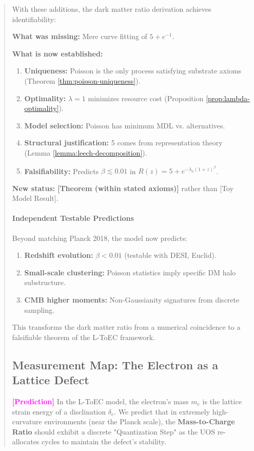 \documentclass[11pt,titlepage]{article}
\newcommand{\tagpred}{\textcolor{magenta}{\textbf{[Prediction]}} }
\begin{document}
\begin{abstract}
With these additions, the dark matter ratio derivation achieves identifiability:

\begin{tcolorbox}[colback=green!5!white,colframe=green!75!black,title=Identifiability Achieved]
\textbf{What was missing:} Mere curve fitting of $5 + e^{-1}$.

\textbf{What is now established:}
\begin{enumerate}
    \item \textbf{Uniqueness:} Poisson is the only process satisfying substrate axioms (Theorem \ref{thm:poisson-uniqueness}).
    \item \textbf{Optimality:} $\lambda=1$ minimizes resource cost (Proposition \ref{prop:lambda-optimality}).
    \item \textbf{Model selection:} Poisson has minimum MDL vs. alternatives.
    \item \textbf{Structural justification:} 5 comes from representation theory (Lemma \ref{lemma:leech-decomposition}).
    \item \textbf{Falsifiability:} Predicts $\beta \lesssim 0.01$ in $R(z) = 5 + e^{-\lambda_0(1+z)^\beta}$.
\end{enumerate}

\textbf{New status:} \textbf{[Theorem (within stated axioms)]} rather than [Toy Model Result].
\end{tcolorbox}

\paragraph{Independent Testable Predictions}
Beyond matching Planck 2018, the model now predicts:
\begin{enumerate}
    \item \textbf{Redshift evolution:} $\beta < 0.01$ (testable with DESI, Euclid).
    \item \textbf{Small-scale clustering:} Poisson statistics imply specific DM halo substructure.
    \item \textbf{CMB higher moments:} Non-Gaussianity signatures from discrete sampling.
\end{enumerate}

This transforms the dark matter ratio from a numerical coincidence to a falsifiable theorem of the L-ToEC framework.



\subsection{Measurement Map: The Electron as a Lattice Defect}
\tagpred In the L-ToEC model, the electron's mass $m_e$ is the lattice strain energy of a disclination $\delta_e$. We predict that in extremely high-curvature environments (near the Planck scale), the \textbf{Mass-to-Charge Ratio} should exhibit a discrete "Quantization Step" as the UOS re-allocates cycles to maintain the defect's stability.
\begin{itemize}
    

\end{itemize}
\end{abstract}
\end{document}
